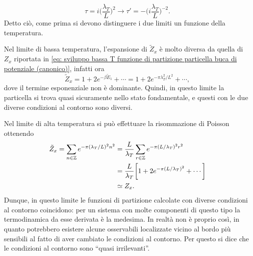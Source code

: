 \begin{equation}
    \tau = i\bigg(\frac{\lambda_T}{L}\bigg)^2 \to \tau ' = -\bigg(i\frac{\lambda_T}{L}\bigg)^{-2}.
\end{equation}
Detto ciò, come prima si devono distinguere i due limiti un funzione della temperatura.
\setcounter{caso}{0}
\begin{caso}
    Nel limite di bassa temperatura, l'espansione di $\tilde{Z}_x$ è molto diversa da quella di $Z_x$ riportata in \eqref{eq: sviluppo bassa T funzione di partizione particella buca di potenziale (canonico)}, infatti ora
    \begin{equation}
        \tilde{Z}_x = 1 + 2e^{-\beta\tilde{E}_1} + \cdots = 1 + 2e^{-\pi\lambda_T^2/L^2} + \cdots,
    \end{equation}
    dove il termine esponenziale non è dominante. Quindi, in questo limite la particella si trova quasi sicuramente nello stato fondamentale, e questi con le due diverse condizioni al contorno sono diversi.
\end{caso}
\begin{caso}
    Nel limite di alta temperatura si può effettuare la risommazione di Poisson ottenendo
    \begin{equation}
        \begin{split}
            \tilde{Z}_x = \sum_{n\in\mathbb{Z}} e^{-\pi(\lambda_T/L)^2n^2} &= \frac{L}{\lambda_T}\sum_{r\in\mathbb{Z}}e^{-\pi(L/\lambda_T)^2r^2} \\
            &= \frac{L}{\lambda_T}\bigg[1 + 2e^{-\pi(L/\lambda_T)^2} + \cdots\bigg] \\
            &\simeq Z_x.
        \end{split}
    \end{equation}
    Dunque, in questo limite le funzioni di partizione calcolate con diverse condizioni al contorno coincidono: per un sistema con molte componenti di questo tipo la termodinamica da esse derivata è la medesima. In realtà non è proprio così, in quanto potrebbero esistere alcune osservabili localizzate vicino al bordo più sensibili al fatto di aver cambiato le condizioni al contorno. Per questo si dice che le condizioni al contorno sono ``quasi irrilevanti''.
\end{caso}

